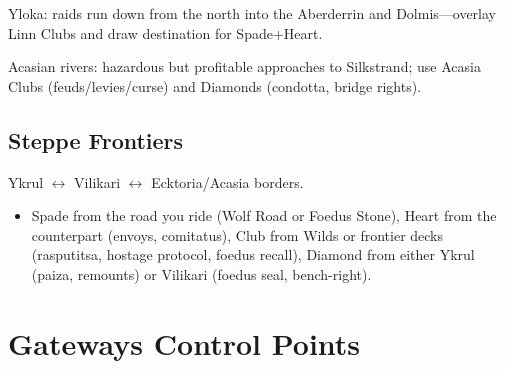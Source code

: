 Yloka: raids run down from the north into the Aberderrin and Dolmis---overlay Linn Clubs and draw destination for Spade+Heart.

Acasian rivers: hazardous but profitable approaches to Silkstrand; use Acasia Clubs (feuds/levies/curse) and Diamonds (condotta, bridge rights).

\subsection{Steppe Frontiers}
Ykrul $\leftrightarrow$ Vilikari $\leftrightarrow$ Ecktoria/Acasia borders.

\begin{itemize}
\item Spade from the road you ride (Wolf Road or Foedus Stone), Heart from the counterpart (envoys, comitatus), Club from Wilds or frontier decks (rasputitsa, hostage protocol, foedus recall), Diamond from either Ykrul (paiza, remounts) or Vilikari (foedus seal, bench-right).
\end{itemize}

\section{Gateways Control Points}

